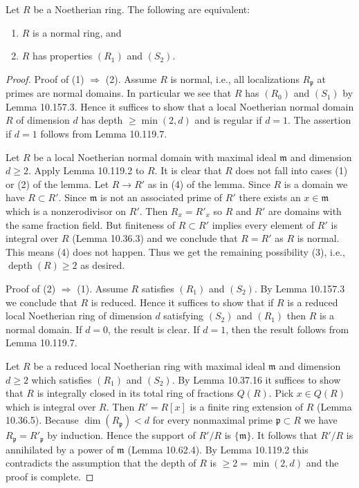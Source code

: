 \begin{lemma}
Let $R$ be a Noetherian ring. The following are equivalent:
\begin{enumerate}
\item $R$ is a normal ring, and
\item $R$ has properties $(R_1)$ and $(S_2)$.
\end{enumerate}
\end{lemma}
\begin{proof}
Proof of (1) $\Rightarrow$ (2). Assume $R$ is normal, i.e., all localizations $R_{\mathfrak p}$ at primes are normal domains. In particular we see that $R$ has $(R_0)$ and $(S_1)$ by Lemma 10.157.3. Hence it suffices to show that a local Noetherian normal domain $R$ of dimension $d$ has depth $\geq\min(2,d)$ and is regular if $d=1$. The assertion if $d=1$ follows from Lemma 10.119.7.

Let $R$ be a local Noetherian normal domain with maximal ideal $\mathfrak m$ and dimension $d\geq2$. Apply Lemma 10.119.2 to $R$. It is clear that $R$ does not fall into cases (1) or (2) of the lemma. Let $R\to R'$ as in (4) of the lemma. Since $R$ is a domain we have $R\subset R'$. Since $\mathfrak m$ is not an associated prime of $R'$ there exists an $x\in\mathfrak m$ which is a nonzerodivisor on $R'$. Then $R_x=R'_x$ so $R$ and $R'$ are domains with the same fraction field. But finiteness of $R\subset R'$ implies every element of $R'$ is integral over $R$ (Lemma 10.36.3) and we conclude that $R=R'$ as $R$ is normal. This means (4) does not happen. Thus we get the remaining possibility (3), i.e., $\operatorname{depth}(R)\geq2$ as desired.

Proof of (2) $\Rightarrow$ (1). Assume $R$ satisfies $(R_1)$ and $(S_2)$. By Lemma 10.157.3 we conclude that $R$ is reduced. Hence it suffices to show that if $R$ is a reduced local Noetherian ring of dimension $d$ satisfying $(S_2)$ and $(R_1)$ then $R$ is a normal domain. If $d=0$, the result is clear. If $d=1$, then the result follows from Lemma 10.119.7.

Let $R$ be a reduced local Noetherian ring with maximal ideal $\mathfrak m$ and dimension $d\geq2$ which satisfies $(R_1)$ and $(S_2)$. By Lemma 10.37.16 it suffices to show that $R$ is integrally closed in its total ring of fractions $Q(R)$. Pick $x\in Q(R)$ which is integral over $R$. Then $R'=R[x]$ is a finite ring extension of $R$ (Lemma 10.36.5). Because $\dim(R_{\mathfrak p})<d$ for every nonmaximal prime $\mathfrak p\subset R$ we have $R_{\mathfrak p}=R'_{\mathfrak p}$ by induction. Hence the support of $R'/R$ is $\{\mathfrak m\}$. It follows that $R'/R$ is annihilated by a power of $\mathfrak m$ (Lemma 10.62.4). By Lemma 10.119.2 this contradicts the assumption that the depth of $R$ is $\geq2=\min(2,d)$ and the proof is complete.
\end{proof}

